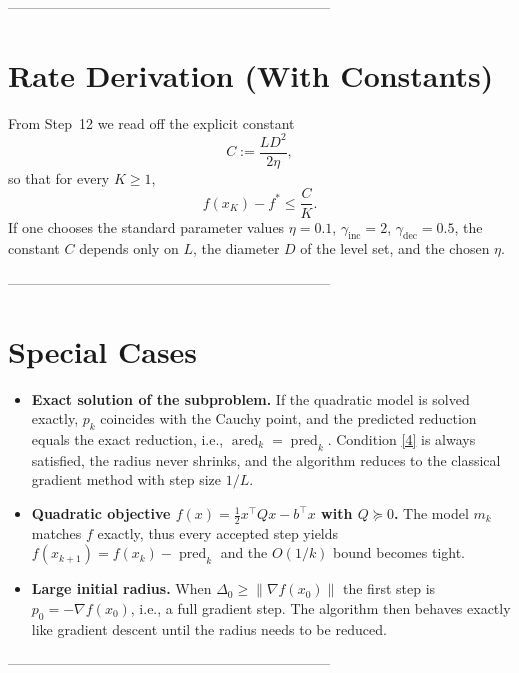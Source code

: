 \documentclass{article}
\newcommand{\norm}[1]{\left\lVert#1\right\rVert}
\begin{document}
---------------------------------------------------------------------

\section*{Rate Derivation (With Constants)}
From Step~12 we read off the explicit constant
\[
C:=\frac{L D^{2}}{2\eta},
\]
so that for every $K\ge1$,
\[
f(x_{K})-f^{*}\le \frac{C}{K}.
\]
If one chooses the standard parameter values $\eta=0.1$, $\gamma_{\text{inc}}=2$, $\gamma_{\text{dec}}=0.5$, the constant $C$ depends only on $L$, the diameter $D$ of the level set, and the chosen $\eta$.

---------------------------------------------------------------------

\section*{Special Cases}
\begin{itemize}
\item \textbf{Exact solution of the subproblem.}  If the quadratic model is solved exactly, $p_{k}$ coincides with the Cauchy point, and the predicted reduction equals the exact reduction, i.e., $\operatorname{ared}_{k}=\operatorname{pred}_{k}$. Condition \eqref{4} is always satisfied, the radius never shrinks, and the algorithm reduces to the classical gradient method with step size $1/L$.
\item \textbf{Quadratic objective $f(x)=\frac12 x^{\top}Qx-b^{\top}x$ with $Q\succeq0$.}  The model $m_{k}$ matches $f$ exactly, thus every accepted step yields $f(x_{k+1})=f(x_{k})-\operatorname{pred}_{k}$ and the $O(1/k)$ bound becomes tight.
\item \textbf{Large initial radius.}  When $\Delta_{0}\ge \norm{\nabla f(x_{0})}$ the first step is $p_{0}=-\nabla f(x_{0})$, i.e., a full gradient step. The algorithm then behaves exactly like gradient descent until the radius needs to be reduced.
\end{itemize}

---------------------------------------------------------------------
\end{document}
